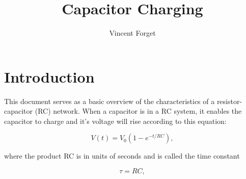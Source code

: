 \documentclass{article}
\title{Capacitor Charging}
\author{Vincent Forget}
\begin{document}
	
	\maketitle
	
	\clearpage
	
	\section{Introduction}
	
	This document serves as a basic overview of the characteristics of a resistor-capacitor (RC) network. When a capacitor is in a RC system, it enables the capacitor to charge and it's voltage will rise according to this equation:
	
	\begin{equation}
		V(t) = V_0 
		\left( 1 - e^{-t/RC}
		\right), 
	\end{equation}
	
	where the product RC is in units of seconds and is called the time constant
	
	\begin{equation}
		\tau = RC,
	\end{equation}
	
\end{document}
